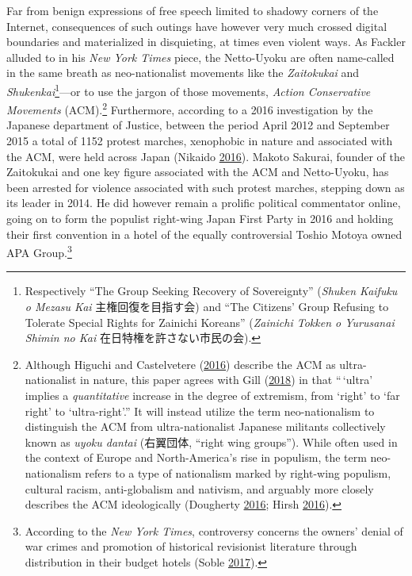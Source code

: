 \documentclass[10pt,british,A4paper,oneside]{memoir}
\begin{document}
Far from benign expressions of free speech limited to shadowy corners of
the Internet, consequences of such outings have however very much
crossed digital boundaries and materialized in disquieting, at times
even violent ways. As Fackler alluded to in his \emph{New York Times}
piece, the Netto-Uyoku are often name-called in the same breath as
neo-nationalist movements like the \emph{Zaitokukai} and
\emph{Shukenkai}\footnote{Respectively ``The Group Seeking Recovery of
  Sovereignty'' (\emph{Shuken Kaifuku o Mezasu Kai} 主権回復を目指す会)
  and ``The Citizens' Group Refusing to Tolerate Special Rights for
  Zainichi Koreans'' (\emph{Zainichi Tokken o Yurusanai Shimin no Kai}
  在日特権を許さない市民の会).}---or to use the jargon of those
movements, \emph{Action Conservative Movements} (ACM).\footnote{Although
  Higuchi and Castelvetere
  (\protect\hyperlink{ref-higuchi_japans_2016}{2016}) describe the ACM
  as ultra-nationalist in nature, this paper agrees with Gill
  (\protect\hyperlink{ref-gill_nativist_2018}{2018}) in that ``\,`ultra'
  implies a \emph{quantitative} increase in the degree of extremism,
  from `right' to `far right' to `ultra-right'.'' It will instead
  utilize the term neo-nationalism to distinguish the ACM from
  ultra-nationalist Japanese militants collectively known as \emph{uyoku
  dantai} (右翼団体, ``right wing groups''). While often used in the
  context of Europe and North-America's rise in populism, the term
  neo-nationalism refers to a type of nationalism marked by right-wing
  populism, cultural racism, anti-globalism and nativism, and
  arguably more closely describes the ACM ideologically (Dougherty
  \protect\hyperlink{ref-dougherty_new_2016}{2016}; Hirsh
  \protect\hyperlink{ref-hirsh_why_2016}{2016}).} Furthermore, according
to a 2016 investigation by the Japanese department of Justice, between the period April 2012
and September 2015 a total
of 1152 protest marches, xenophobic in nature and associated with the
ACM, were held across Japan (Nikaido
\protect\hyperlink{ref-nikaido_eng:_2016}{2016}). Makoto Sakurai,
founder of the Zaitokukai and one key figure associated with the ACM and
Netto-Uyoku, has been arrested for violence associated with such protest
marches, stepping down as its leader in 2014. He did however remain a
prolific political commentator online, going on to form the populist
right-wing Japan First Party in 2016 and holding their first convention in
a hotel of the equally controversial Toshio Motoya owned APA
Group.\footnote{According to the \emph{New York Times}, controversy
  concerns the owners' denial of war crimes and promotion of historical
  revisionist literature through distribution in their budget hotels
  (Soble \protect\hyperlink{ref-soble_right-wing_2017}{2017}).}
\end{document}
